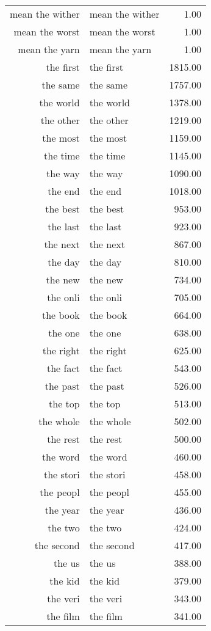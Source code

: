 \begin{table}[ht]
\begin{tabular}{rlr}
  mean the wither & mean the wither & 1.00 \\ 
  mean the worst & mean the worst & 1.00 \\ 
  mean the yarn & mean the yarn & 1.00 \\ 
  the first & the first & 1815.00 \\ 
  the same & the same & 1757.00 \\ 
  the world & the world & 1378.00 \\ 
  the other & the other & 1219.00 \\ 
  the most & the most & 1159.00 \\ 
  the time & the time & 1145.00 \\ 
  the way & the way & 1090.00 \\ 
  the end & the end & 1018.00 \\ 
  the best & the best & 953.00 \\ 
  the last & the last & 923.00 \\ 
  the next & the next & 867.00 \\ 
  the day & the day & 810.00 \\ 
  the new & the new & 734.00 \\ 
  the onli & the onli & 705.00 \\ 
  the book & the book & 664.00 \\ 
  the one & the one & 638.00 \\ 
  the right & the right & 625.00 \\ 
  the fact & the fact & 543.00 \\ 
  the past & the past & 526.00 \\ 
  the top & the top & 513.00 \\ 
  the whole & the whole & 502.00 \\ 
  the rest & the rest & 500.00 \\ 
  the word & the word & 460.00 \\ 
  the stori & the stori & 458.00 \\ 
  the peopl & the peopl & 455.00 \\ 
  the year & the year & 436.00 \\ 
  the two & the two & 424.00 \\ 
  the second & the second & 417.00 \\ 
  the us & the us & 388.00 \\ 
  the kid & the kid & 379.00 \\ 
  the veri & the veri & 343.00 \\ 
  the film & the film & 341.00 \\ 

\end{tabular}
\end{table}
